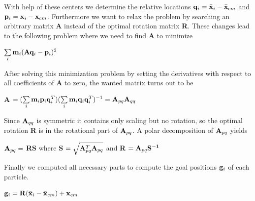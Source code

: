 \documentclass[
	11pt, 
	DIV10,
	a4paper, 
	oneside, 
	headings=normal, 
	captions=tableheading,
	final, 
	numbers=noenddot
]{scrartcl}
\begin{document}
	\noindent With help of these centers we determine the relative locations $\mathnormal{\mathbf{q}_i}=\mathnormal{\mathbf{\bar{x}}_i}-\mathnormal{\mathbf{\bar{x}}_{cm}}$ and\\
	$\mathnormal{\mathbf{p}_i}=\mathnormal{\mathbf{x}_i}-\mathnormal{\mathbf{x}_{cm}}$. Furthermore we want to relax the problem by searching an arbitrary matrix \textbf{A} instead of the optimal rotation matrix \textbf{R}. These changes lead to the following problem where we need to find $\mathbf{A}$ to minimize
	\begin{center}
		$\sum\limits_{i}\mathnormal{\mathbf{m}_i}(\mathnormal{\mathbf{A}\mathbf{q}_i}-\mathnormal{\mathbf{p}_i})^2$
	\end{center}
	\noindent After solving this minimization problem by setting the derivatives with respect to all coefficients of \textbf{A} to zero, the wanted matrix turns out to be
	\begin{center}
		\textbf{A} $=(\sum\limits_{i}\mathnormal{\mathbf{m}_i}\mathnormal{\mathbf{p}_i}\mathnormal{\mathbf{q}_i^T})(\sum\limits_{i}\mathnormal{\mathbf{m}_i}\mathnormal{\mathbf{q}_i}\mathnormal{\mathbf{q}_i^T})^{-1}=\mathnormal{\mathbf{A}}_{pq}\mathnormal{\mathbf{A}}_{qq}$
	\end{center}
	\noindent Since $\mathnormal{\mathbf{A}_{qq}}$ is symmetric it contains only scaling but no rotation, so the optimal rotation \textbf{R} is in the rotational part of $\mathnormal{\mathbf{A}_{pq}}$. A polar decomposition of $\mathnormal{\mathbf{A}_{pq}}$ yields
	\begin{center}
		$\mathnormal{\mathbf{A}_{pq}}=$ \textbf{RS} where \textbf{S} $=\sqrt{\mathnormal{\mathbf{A}_{pq}^T} \mathnormal{\mathbf{A}_{pq}}}$ and \textbf{R} $=\mathnormal{\mathbf{A}_{pq}}\mathnormal{\mathbf{S^{-1}}}$
	\end{center}
	\noindent Finally we computed all necessary parts to compute the goal positions $\mathnormal{\mathbf{g}_i}$ of each particle.
	\begin{center}
		$\mathnormal{\mathbf{g}_i}=\mathnormal{\mathbf{R}}(\mathnormal{\mathbf{\bar{x}}_i}-\mathnormal{\mathbf{\bar{x}}_{cm}})+\mathnormal{\mathbf{x}_{cm}}$ \cite{11}
	\end{center}
\end{document}
